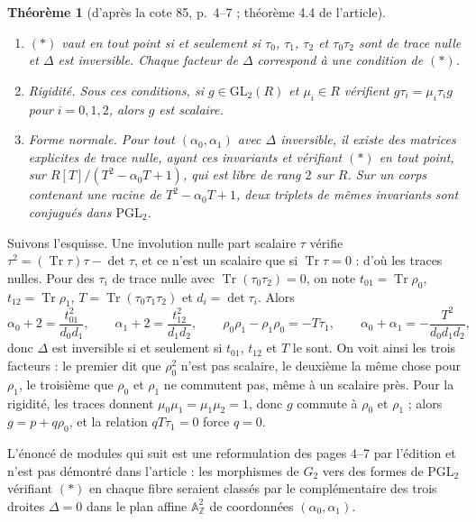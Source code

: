 \documentclass[11pt,a4paper]{amsart}
\theoremstyle{definition}
\theoremstyle{plain}
\newtheorem{theoreme}{Théorème}
\theoremstyle{remark}
\theoremstyle{plain}
\newcommand{\Z}{\mathbb Z}
\newcommand{\PGL}{\mathrm{PGL}_2}
\newcommand{\GL}{\mathrm{GL}_2}
\newcommand{\Tr}{\operatorname{Tr}}
\begin{document}
\begin{theoreme}[d'après la cote 85, p.~4--7 ; théorème 4.4 de l'article]
\leavevmode
\begin{enumerate}
\item $(*)$ vaut en tout point si et seulement si $\tau_0$, $\tau_1$, $\tau_2$ et $\tau_0\tau_2$ sont de trace nulle et $\Delta$ est inversible. Chaque facteur de $\Delta$ correspond à une condition de $(*)$.
\item \emph{Rigidité.} Sous ces conditions, si $g \in \GL(R)$ et $\mu_i \in R$ vérifient $g\tau_i = \mu_i\tau_ig$ pour $i = 0, 1, 2$, alors $g$ est scalaire.
\item \emph{Forme normale.} Pour tout $(\alpha_0, \alpha_1)$ avec $\Delta$ inversible, il existe des matrices explicites de trace nulle, ayant ces invariants et vérifiant $(*)$ en tout point, sur $R[T]/(T^2 - \alpha_0T + 1)$, qui est libre de rang $2$ sur $R$. Sur un corps contenant une racine de $T^2 - \alpha_0T + 1$, deux triplets de mêmes invariants sont conjugués dans $\PGL$.
\end{enumerate}
\end{theoreme}

Suivons l'esquisse. Une involution nulle part scalaire $\tau$ vérifie $\tau^2 = (\Tr\tau)\tau - \det\tau$, et ce n'est un scalaire que si $\Tr\tau = 0$ : d'où les traces nulles. Pour des $\tau_i$ de trace nulle avec $\Tr(\tau_0\tau_2) = 0$, on note $t_{01} = \Tr\rho_0$, $t_{12} = \Tr\rho_1$, $T = \Tr(\tau_0\tau_1\tau_2)$ et $d_i = \det\tau_i$. Alors
\[
\alpha_0 + 2 = \frac{t_{01}^2}{d_0d_1}, \qquad \alpha_1 + 2 = \frac{t_{12}^2}{d_1d_2}, \qquad \rho_0\rho_1 - \rho_1\rho_0 = -T\tau_1, \qquad \alpha_0 + \alpha_1 = -\frac{T^2}{d_0d_1d_2},
\]
donc $\Delta$ est inversible si et seulement si $t_{01}$, $t_{12}$ et $T$ le sont. On voit ainsi les trois facteurs : le premier dit que $\rho_0^2$ n'est pas scalaire, le deuxième la même chose pour $\rho_1$, le troisième que $\rho_0$ et $\rho_1$ ne commutent pas, même à un scalaire près. Pour la rigidité, les traces donnent $\mu_0\mu_1 = \mu_1\mu_2 = 1$, donc $g$ commute à $\rho_0$ et $\rho_1$ ; alors $g = p + q\rho_0$, et la relation $qT\tau_1 = 0$ force $q = 0$.

L'énoncé de modules qui suit est une reformulation des pages 4--7 par l'édition et n'est pas démontré dans l'article : les morphismes de $G_2$ vers des formes de $\PGL$ vérifiant $(*)$ en chaque fibre seraient classés par le complémentaire des trois droites $\Delta = 0$ dans le plan affine $\mathbb A^2_\Z$ de coordonnées $(\alpha_0, \alpha_1)$.
\end{document}
